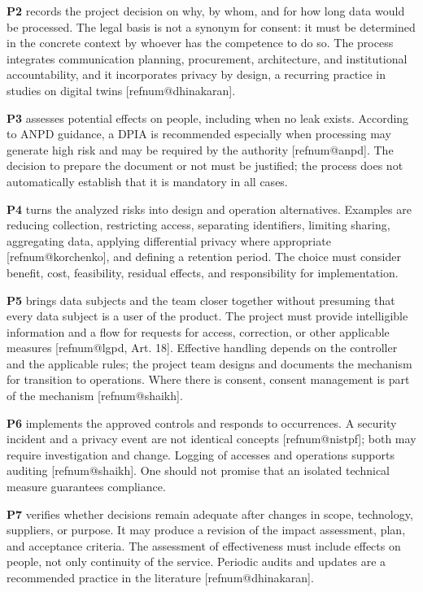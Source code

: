 \documentclass[12pt,a4paper,article,oneside,brazil,english]{abntex2}
\makeatletter
\newcommand{\refnum}[1]{\csname refnum@#1\endcsname}
\makeatother
\begin{document}
\textbf{P2} records the project decision on why, by whom, and for how long data would be processed. The legal basis is not a synonym for consent: it must be determined in the concrete context by whoever has the competence to do so. The process integrates communication planning, procurement, architecture, and institutional accountability, and it incorporates privacy by design, a recurring practice in studies on digital twins [\refnum{dhinakaran}].

\textbf{P3} assesses potential effects on people, including when no leak exists. According to ANPD guidance, a DPIA is recommended especially when processing may generate high risk and may be required by the authority [\refnum{anpd}]. The decision to prepare the document or not must be justified; the process does not automatically establish that it is mandatory in all cases.

\textbf{P4} turns the analyzed risks into design and operation alternatives. Examples are reducing collection, restricting access, separating identifiers, limiting sharing, aggregating data, applying differential privacy where appropriate [\refnum{korchenko}], and defining a retention period. The choice must consider benefit, cost, feasibility, residual effects, and responsibility for implementation.

\textbf{P5} brings data subjects and the team closer together without presuming that every data subject is a user of the product. The project must provide intelligible information and a flow for requests for access, correction, or other applicable measures [\refnum{lgpd}, Art. 18]. Effective handling depends on the controller and the applicable rules; the project team designs and documents the mechanism for transition to operations. Where there is consent, consent management is part of the mechanism [\refnum{shaikh}].

\textbf{P6} implements the approved controls and responds to occurrences. A security incident and a privacy event are not identical concepts [\refnum{nistpf}]; both may require investigation and change. Logging of accesses and operations supports auditing [\refnum{shaikh}]. One should not promise that an isolated technical measure guarantees compliance.

\textbf{P7} verifies whether decisions remain adequate after changes in scope, technology, suppliers, or purpose. It may produce a revision of the impact assessment, plan, and acceptance criteria. The assessment of effectiveness must include effects on people, not only continuity of the service. Periodic audits and updates are a recommended practice in the literature [\refnum{dhinakaran}].
\end{document}
